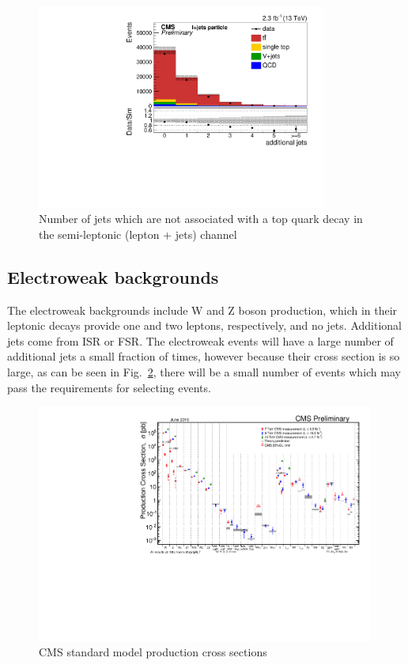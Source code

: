 \begin{figure}[ht!]
\begin{center}
    \includegraphics[width=0.85\textwidth]{images/Theory/ttbarAdd.pdf}
    \caption{Number of jets which are not associated with a top quark decay in the \ttbar semi-leptonic (lepton + jets) channel~\cite{CMS-PAS-TOP-16-008}}
    \label{fig:ttbarAdd}
\end{center}
\end{figure}

\subsection{Electroweak backgrounds}
The electroweak backgrounds include W and Z boson production, which in their leptonic decays provide one and two leptons, respectively, and no jets. Additional jets come from ISR or FSR. The electroweak events will have a large number of additional jets a small fraction of times, however because their cross section is so large, as can be seen in Fig.~\ref{fig:CMSstairway}, there will be a small number of events which may pass the requirements for selecting \tttt events.
\begin{figure}[ht!]
\begin{center}
    \includegraphics[width=0.99\textwidth]{images/Theory/stairway.pdf}
    \caption{CMS standard model production cross sections~\cite{stairwaytwiki}}
    \label{fig:CMSstairway}
\end{center}
\end{figure}

